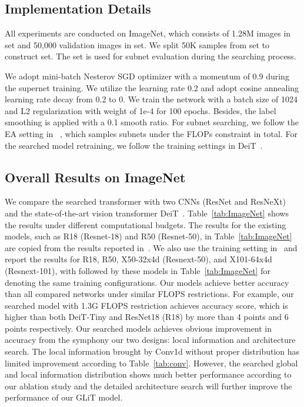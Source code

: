 \documentclass[10pt,twocolumn,letterpaper]{article}
\begin{document}
\subsection{Implementation Details}
All experiments are conducted on ImageNet, which consists of 1.28M images in  set and 50,000 validation images in  set. We split 50K samples from  set to construct  set. The  set is used for subnet evaluation during the searching process. 

We adopt mini-batch Nesterov SGD optimizer with a momentum of 0.9 during the supernet training.  
We utilize the learning rate 0.2 and adopt cosine annealing learning rate decay from 0.2 to 0. We train the network with a batch size of 1024 and L2 regularization with weight of 1e-4 for 100 epochs. Besides, the label smoothing is applied with a 0.1 smooth ratio. For subnet searching, we follow the EA setting in ~\cite{SPOS-ECCV20-Guo}, which samples  subnets under the FLOPs constraint in total.
For the searched model retraining, we follow the training settings in DeiT~\cite{deit}.

\subsection{Overall Results on ImageNet}\label{sub:classexp}
We compare the searched transformer with two CNNs (ResNet and ResNeXt) and the state-of-the-art vision transformer DeiT~\cite{deit}. Table~\ref{tab:ImageNet} shows the  results under different computational budgets. The results for the existing models, such as R18 (Resnet-18) and R50 (Resnet-50), in Table~\ref{tab:ImageNet} are copied from the results reported in~\cite{deit}. We also use the training setting in~\cite{deit} and report the results for R18, R50, X50-32x4d (Resnext-50), and X101-64x4d (Resnext-101), with  followed by these models in Table~\ref{tab:ImageNet} for denoting the same training configurations.
Our models achieve better accuracy than all compared networks under similar FLOPS restrictions. For example, our searched model with 1.3G FLOPS restriction achieves  accuracy score, which is higher than both DeiT-Tiny and ResNet18 (R18) by more than 4 points and 6 points respectively.
Our searched models achieves obvious improvement in accuracy from the symphony our two designs: local information and architecture search. The local information brought by Conv1d without proper distribution has limited improvement according to Table~\ref{tab:conv}. However, the searched global and local information distribution shows much better performance according to our ablation study and the detailed architecture search will further improve the performance of our GLiT model.
\end{document}
